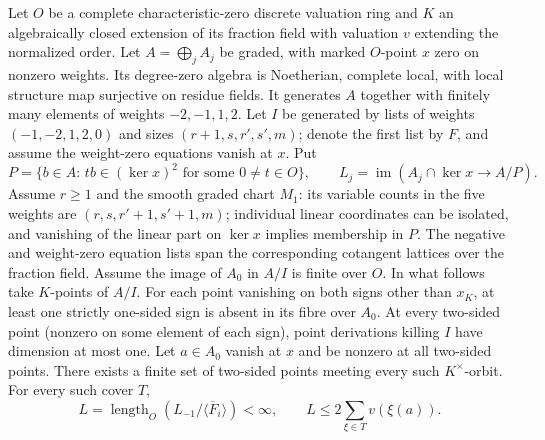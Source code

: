 
\begin{formalstatement}\label{pn:P027}
Let \(O\) be a complete characteristic-zero discrete valuation ring and
\(K\) an algebraically closed extension of its fraction field with
valuation \(v\) extending the normalized order. Let \(A=\bigoplus_j A_j\)
be graded, with marked \(O\)-point \(x\) zero on nonzero weights.
Its degree-zero algebra is Noetherian, complete local, with local
structure map surjective on residue fields. It generates \(A\) together
with finitely many elements of weights \(-2,-1,1,2\).
Let \(I\) be generated by lists of weights \((-1,-2,1,2,0)\) and sizes
\((r+1,s,r',s',m)\); denote the first list by \(F\), and assume the
weight-zero equations vanish at \(x\). Put
\[
 P=\{b\in A:\,tb\in(\ker x)^2\text{ for some }0\ne t\in O\},
 \qquad L_j=\operatorname{im}(A_j\cap\ker x\longrightarrow A/P).
\]
Assume \(r\ge1\) and the smooth graded chart \(M_1\): its variable
counts in the five weights are \((r,s,r'+1,s'+1,m)\); individual
linear coordinates can be isolated, and vanishing of the linear
part on \(\ker x\) implies membership in \(P\). The negative and
weight-zero equation lists span the corresponding cotangent lattices
over the fraction field. Assume the image of \(A_0\) in \(A/I\)
is finite over \(O\). In what follows take \(K\)-points of \(A/I\).
For each point vanishing on both signs other
than \(x_K\), at least one strictly one-sided sign is absent in its
fibre over \(A_0\). At every two-sided point (nonzero on some element
of each sign), point derivations killing \(I\) have dimension at most
one. Let \(a\in A_0\) vanish at \(x\) and be nonzero at all two-sided
points. There exists a finite set of two-sided points meeting every
such \(K^\times\)-orbit. For every such cover \(T\),
\[
 L=\operatorname{length}_O(L_{-1}/\langle\overline F_i\rangle)
 <\infty,\qquad L\le 2\sum_{\xi\in T}v(\xi(a)).
\]
\end{formalstatement}

